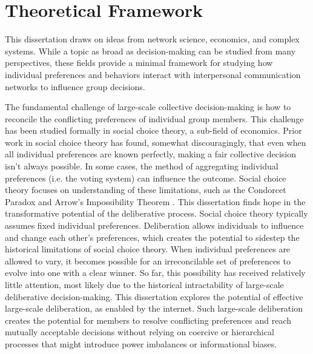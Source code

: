 \section{Theoretical Framework}

This dissertation draws on ideas from network science, economics, and complex
systems.
While a topic as broad as decision-making can be studied from many perspectives,
these fields provide a minimal framework for studying how individual preferences
and behaviors interact with interpersonal communication networks to influence
group decisions.

The fundamental challenge of large-scale collective decision-making is how to
reconcile the conflicting preferences of individual group members.
This challenge has been studied formally in social choice theory,
a sub-field of economics.
Prior work in social choice theory has found, somewhat discouragingly,
that even when all individual preferences are known perfectly,
making a fair collective decision isn't always possible.
In some cases, the method of aggregating individual preferences
(i.e. the voting system) can influence the outcome.
Social choice theory focuses on understanding of these limitations,
such as the Condorcet Paradox
\cite{condorcet_essay_1785} and
Arrow's Impossibility Theorem \cite{arrow_social_2012}.
This dissertation finds hope in the transformative potential of the
deliberative process.
Social choice theory typically assumes fixed individual preferences.
Deliberation allows individuals to influence and change each other's
preferences,
which creates the potential to sidestep the historical limitations of
social choice theory.
When individual preferences are allowed to vary, it becomes possible for an
irreconcilable set of preferences to evolve into one with a clear winner.
So far, this possibility has received relatively little attention,
most likely due to the historical intractability of large-scale deliberative
decision-making.
This dissertation explores the potential of effective large-scale deliberation, as enabled by the internet.
Such large-scale deliberation creates the potential for members to
resolve conflicting preferences and reach mutually acceptable decisions
without relying on coercive or hierarchical processes that might introduce
power imbalances or informational biases.


